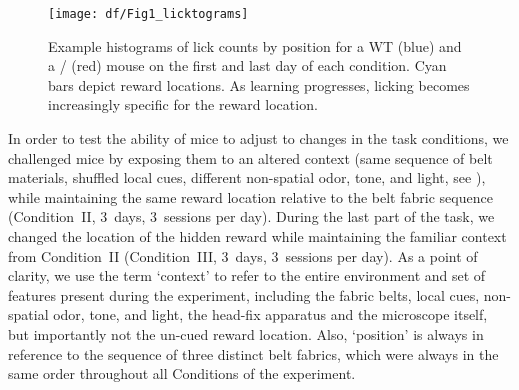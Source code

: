 \begin{figure}
	\centering
	\texttt{[image: df/Fig1\_licktograms]}
	\caption[Example histograms of lick counts by position]{Example histograms of lick counts by position for a WT (blue) and a \df/ (red) mouse on the first and last day of each condition. Cyan bars depict reward locations. As learning progresses, licking becomes increasingly specific for the reward location.}
	\label{fig:df:licktograms}
\end{figure}
In order to test the ability of mice to adjust to changes in the task conditions, we challenged mice by exposing them to an altered context (same sequence of belt materials, shuffled local cues, different non-spatial odor, tone, and light, see ), while maintaining the same reward location relative to the belt fabric sequence (Condition~II, 3~days, 3~sessions per day). During the last part of the task, we changed the location of the hidden reward while maintaining the familiar context from Condition~II (Condition~III, 3~days, 3~sessions per day). As a point of clarity, we use the term `context' to refer to the entire environment and set of features present during the experiment, including the fabric belts, local cues, non-spatial odor, tone, and light, the head-fix apparatus and the microscope itself, but importantly not the un-cued reward location. Also, `position' is always in reference to the sequence of three distinct belt fabrics, which were always in the same order throughout all Conditions of the experiment.

